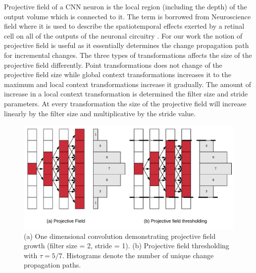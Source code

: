 Projective field \cite{le2017receptive, basiccnnoperations} of a CNN neuron is the local region (including the depth) of the output volume which is connected to it.
The term is borrowed from Neuroscience field where it is used to describe the spatiotemporal effects exerted by a retinal cell on all of the outputs of the neuronal circuitry \cite{de2011projective}.
For our work the notion of projective field is useful as it essentially determines the change propagation path for incremental changes.
The three types of transformations affects the size of the projective field differently. Point transformations does not change of the projective field size while global context transformations increases it to the maximum and local context transformations increase it gradually.
The amount of increase in a local context transformation is determined the filter size and stride parameters. At every transformation the size of the projective field will increase linearly by the filter size and multiplicative by the stride value.

\begin{figure}[t]
\includegraphics[width=\columnwidth]{images/pf_truncate}
\caption{(a) One dimensional convolution demonstrating projective field growth (filter size = 2, stride = 1). (b) Projective field thresholding with $\tau = 5/7$. Histograms denote the number of unique change propagation paths.}
\label{fig:pf_truncate}
\end{figure}

